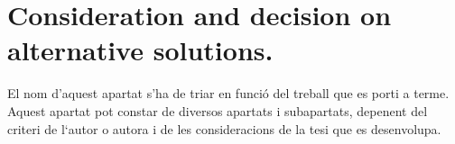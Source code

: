 \chapter{Consideration and decision on alternative solutions.}

El nom d’aquest apartat s'ha de triar en funció del treball que es porti a terme. Aquest apartat pot constar de diversos apartats i subapartats, depenent del criteri de l‘autor o autora i de les consideracions de la tesi que es desenvolupa.